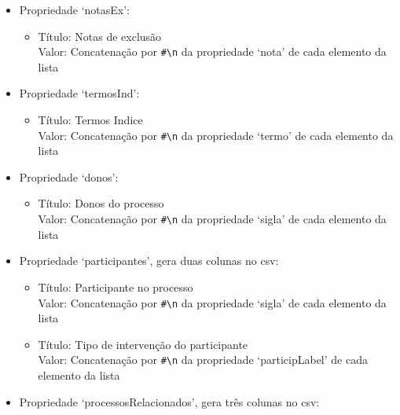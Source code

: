 \begin{itemize}
\begin{itemize}
\begin{itemize}
\begin{itemize}
                \item Título: Exemplos de NA \\
                      Valor: Concatenação por \verb|#\n| da propriedade `exemplo' de cada elemento da lista
            \end{itemize}
            \item Propriedade `notasEx':
            \begin{itemize}
                \item Título: Notas de exclusão \\
                      Valor: Concatenação por \verb|#\n| da propriedade `nota' de cada elemento da lista
            \end{itemize}
            \item Propriedade `termosInd':
            \begin{itemize}
                \item Título: Termos Indice \\
                      Valor: Concatenação por \verb|#\n| da propriedade `termo' de cada elemento da lista
            \end{itemize}
            \item Propriedade `donos':
            \begin{itemize}
                \item Título: Donos do processo \\
                      Valor: Concatenação por \verb|#\n| da propriedade `sigla' de cada elemento da lista
            \end{itemize}
            \item Propriedade `participantes', gera duas colunas no \acrshort{csv}:
            \begin{itemize}
                \item Título: Participante no processo \\
                      Valor: Concatenação por \verb|#\n| da propriedade `sigla' de cada elemento da lista
                \item Título: Tipo de intervenção do participante \\
                      Valor: Concatenação por \verb|#\n| da propriedade `participLabel' de cada elemento da lista
            \end{itemize}
            \item Propriedade `processosRelacionados', gera três colunas no \acrshort{csv}:
            \begin{itemize}

\end{itemize}
\end{itemize}
\end{itemize}
\end{itemize}
